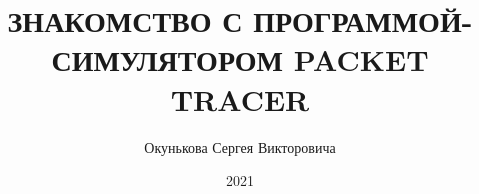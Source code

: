 \documentclass[bachelor, och, labwork]{shiza}
\begin{document}
\chair{}

\title{ЗНАКОМСТВО С ПРОГРАММОЙ-СИМУЛЯТОРОМ PACKET TRACER}






\author{Окунькова Сергея Викторовича}








\date{2021}

\maketitle

\end{document}
